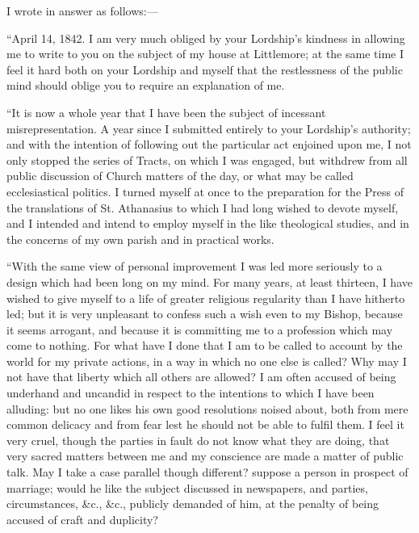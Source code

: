 I wrote in answer as follows:—

``April 14, 1842. I am very much obliged by your Lordship's
kindness in allowing me to write to you on the subject of my house at
Littlemore; at the same time I feel it hard both on your Lordship and
myself that the restlessness of the public mind should oblige you to
require an explanation of me.

``It is now a whole year that I have been the subject of
incessant misrepresentation. A year since I submitted entirely to your
Lordship's authority; and with the intention of following out the
particular act enjoined upon me, I not only stopped the series of
Tracts, on which I was engaged, but withdrew from all public discussion
of Church matters of the day, or what may be called ecclesiastical
politics. I turned myself at once to the preparation for the Press of
the translations of St. Athanasius to which I had long wished to devote
myself, and I intended and intend to employ myself in the like
theological studies, and in the concerns of my own parish and in
practical works.

``With the same view of personal improvement I was led more
seriously to a design which had been long on my mind. For many years, at
least thirteen, I have wished to give myself to a life of greater
religious regularity than I have hitherto led; but it is very unpleasant
to confess such a wish even to my Bishop, because it seems arrogant, and
because it is committing me to a profession which may come to nothing.
For what have I done that I am to be called to account by the world for
my private actions, in a way in which no one else is called? Why may I
not have that liberty which all others are allowed? I am often accused
of being underhand and uncandid in respect to the intentions to which I
have been alluding: but no one likes his own good resolutions noised
about, both from mere common delicacy and from fear lest he should not
be able to fulfil them. I feel it very cruel, though the parties in
fault do not know what they are doing, that very sacred matters between
me and my conscience are made a matter of public talk. May I take a case
parallel though different? suppose a person in prospect of marriage;
would he like the subject discussed in newspapers, and parties,
circumstances, \&c., \&c., publicly demanded of him, at the
penalty of being accused of craft and duplicity?

